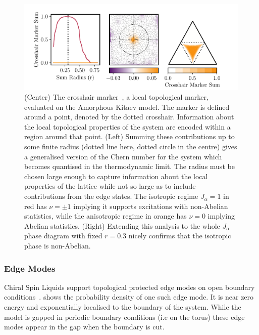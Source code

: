 \hypertarget{fig:phase_diagram_chern}{%
\begin{figure}
\centering
\includegraphics[width=1\textwidth,height=\textheight]{figure_code/amk_chapter/results/phase_diagram_chern/phase_diagram_chern}
\caption[{Local Chern Markers}]{(Center) The crosshair marker~\autocite{peru_preprint}, a local topological marker, evaluated on the Amorphous Kitaev model. The marker is defined around a point, denoted by the dotted crosshair. Information about the local topological properties of the system are encoded within a region around that point. (Left) Summing these contributions up to some finite radius (dotted line here, dotted circle in the centre) gives a generalised version of the Chern number for the system which becomes quantised in the thermodynamic limit. The radius must be chosen large enough to capture information about the local properties of the lattice while not so large as to include contributions from the edge states. The isotropic regime \(J_\alpha = 1\) in red has \(\nu = \pm 1\) implying it supports excitations with non-Abelian statistics, while the anisotropic regime in orange has \(\nu = 0\) implying Abelian statistics. (Right) Extending this analysis to the whole \(J_\alpha\) phase diagram with fixed \(r = 0.3\) nicely confirms that the isotropic phase is non-Abelian.}
\label{fig:phase_diagram_chern}
\end{figure}
}

\hypertarget{edge-modes}{%
\subsubsection{Edge Modes}\label{edge-modes}}

Chiral Spin Liquids support topological protected edge modes on open boundary conditions~\autocite{qi_general_2006}.  shows the probability density of one such edge mode. It is near zero energy and exponentially localised to the boundary of the system. While the model is gapped in periodic boundary conditions (i.e on the torus) these edge modes appear in the gap when the boundary is cut.

